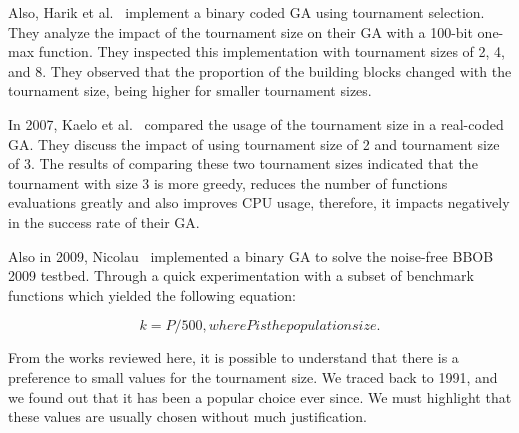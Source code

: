 Also, Harik et al.~\cite{harik1999gambler} implement a binary coded GA using tournament selection. They analyze the impact of the tournament size on their GA with a 100-bit one-max function. They inspected this implementation with tournament sizes of 2, 4, and 8. They observed that the proportion of the building blocks changed with the tournament size, being higher for smaller tournament sizes.

In 2007, Kaelo et al.~\cite{kaelo2007integrated} compared the usage of the tournament size in a real-coded GA. They discuss the impact of using tournament size of 2 and tournament size of 3. The results of comparing these two tournament sizes indicated that the tournament with size 3 is more greedy, reduces the number of functions evaluations greatly and also improves CPU usage, therefore, it impacts negatively in the success rate of their GA.


Also in 2009, Nicolau~\cite{nicolau2009application} implemented a binary GA to solve the noise-free BBOB 2009 testbed. Through a quick experimentation with a subset of benchmark functions which yielded the following equation:

\begin{equation}
k = P/500,{ where P is the population size.}
\end{equation}


From the works reviewed here, it is possible to understand that there is a preference to small values for the tournament size. We traced back to 1991, and we found out that it has been a popular choice ever since. We must highlight that these values are usually chosen without much justification.




